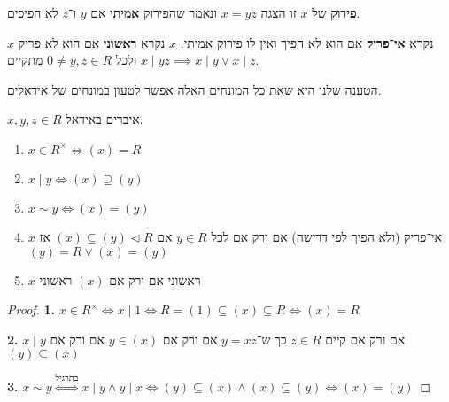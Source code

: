 \begin{definition}[פירוק]
	\textbf{פירוק} של $x$ זו הצגה $x = yz$ ונאמר שהפירוק \textbf{אמיתי} אם $y$ ו־$z$ לא הפיכים.
\end{definition}
\begin{definition}
	$x$ נקרא \textbf{אי־פריק} אם הוא לא הפיך ואין לו פירוק אמיתי.
	$x$ נקרא \textbf{ראשוני} אם הוא לא פריק ולכל $0 \ne y, z \in R$ מתקיים $x \mid yz \implies x \mid y \lor x \mid z$.
\end{definition}
הטענה שלנו היא שאת כל המונחים האלה אפשר לטעון במונחים של אידאלים.
\begin{proposition}
	$x, y, z \in R$ איברים באידאל.
	\begin{enumerate}
		\item $x \in R^\times \iff (x) = R$
		\item $x \mid y \iff (x) \supseteq (y)$
		\item $x \sim y \iff (x) = (y)$
		\item $x$ אי־פריק (ולא הפיך לפי דרישה) אם ורק אם לכל $y \in R$ אם $(x) \subseteq (y) \triangleleft R$ אז $(y) = R \lor (x) = (y)$
		\item $x$ ראשוני אם ורק אם $(x)$ ראשוני
	\end{enumerate}
\end{proposition}
\begin{proof}
	\textbf{1.}
	$x \in R^\times \iff x \mid 1 \iff R = (1) \subseteq (x) \subseteq R \iff (x) = R$

	\textbf{2.}
	$x \mid y$ אם ורק אם קיים $z \in R$ כך ש־$y = xz$ אם ורק אם $y \in (x)$ אם ורק אם $(y) \subseteq (x)$

	\textbf{3.}
	$x \sim y \overset{\text{בתרגיל}}{\iff} x \mid y \land y \mid x \iff (y) \subseteq (x) \land (x) \subseteq (y) \iff (x) = (y)$
\end{proof}


